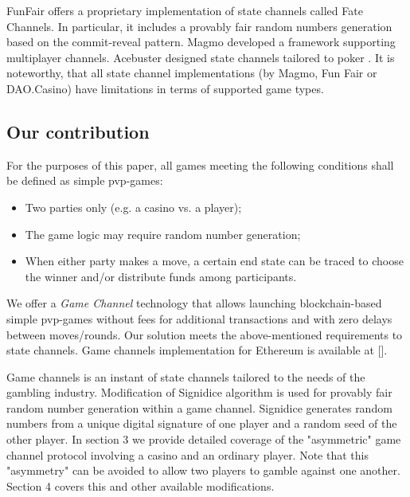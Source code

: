 	FunFair\cite{bib15} offers a proprietary implementation of state channels called Fate Channels. In particular, it includes a provably fair random numbers generation based on the commit-reveal pattern. Magmo \cite{bib16} developed a framework supporting multiplayer channels. Acebuster designed  state channels tailored to poker \cite{bib17}. It is noteworthy, that all state channel implementations (by Magmo, Fun Fair or DAO.Casino) have limitations in terms of supported game types.

		\subsection {Our contribution}
	For the purposes of this paper, all games meeting the following conditions shall be defined as simple pvp-games:
	\begin{itemize}
		\item Two parties only (e.g. a casino vs. a player);
		\item The game logic may require random number generation;
		\item When either party makes a move, a certain end state can be traced to choose the winner and/or distribute funds among participants.
	\end{itemize}
	We offer a \textit {Game Channel} technology that allows launching blockchain-based simple pvp-games without fees for additional transactions and with zero delays between moves/rounds. Our solution meets the above-mentioned requirements to state channels. Game channels implementation for Ethereum is available at [].

	Game channels is an instant of state channels tailored to the needs of the gambling industry. Modification of Signidice \cite{18} algorithm is used for provably fair random number generation within a game channel. Signidice generates random numbers from a unique digital signature of one player and a random seed of the other player. In section 3 we provide detailed coverage of the "asymmetric" game channel protocol involving a casino and an ordinary player. Note that this "asymmetry" can be avoided to allow two players to gamble against one another. Section 4 covers this and other available modifications.